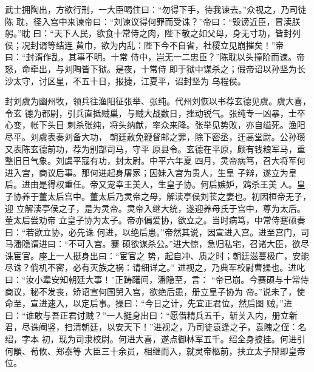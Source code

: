 武士拥陶出，方欲行刑，一大臣喝住曰：“勿得下手，待我谏去。”众视之，乃司徒陈
耽，径入宫中来谏帝曰：“刘谏议得何罪而受诛？”帝曰：“毁谤近臣，冒渎朕躬。”耽
曰：“天下人民，欲食十常侍之肉，陛下敬之如父母，身无寸功，皆封列侯；况封谞等结连
黄巾，欲为内乱：陛下今不自省，社稷立见崩摧矣！”帝曰：“封谞作乱，其事不明。十常
侍中，岂无一二忠臣？”陈耽以头撞阶而谏。帝怒，命牵出，与刘陶皆下狱。是夜，十常侍
即于狱中谋杀之；假帝诏以孙坚为长沙太守，讨区星，不五十日，报捷，江夏平，诏封坚为
乌程侯。

封刘虞为幽州牧，领兵往渔阳征张举、张纯。代州刘恢以书荐玄德见虞。虞大喜，令玄
德为都尉，引兵直抵贼巢，与贼大战数日，挫动锐气。张纯专一凶暴，士卒心变，帐下头目
刺杀张纯，将头纳献，率众来降。张举见势败，亦自缢死。渔阳尽平。刘虞表奏刘备大功，
朝廷赦免鞭督邮之罪，除下密丞，迁高堂尉。公孙瓒又表陈玄德前功，荐为别部司马，守平
原县令。玄德在平原，颇有钱粮军马，重整旧日气象。刘虞平寇有功，封太尉。中平六年夏
四月，灵帝病笃，召大将军何进入宫，商议后事。那何进起身屠家；因妹入宫为贵人，生皇
子辩，遂立为皇后。进由是得权重任。帝又宠幸王美人，生皇子协。何后嫉妒，鸩杀王美
人。皇子协养于董太后宫中。董太后乃灵帝之母，解渎亭侯刘苌之妻也。初因桓帝无子，迎
立解渎亭侯之子，是为灵帝。灵帝入继大统，遂迎养母氏于宫中，尊为太后。董太后尝劝帝
立皇子协为太子。帝亦偏爱协，欲立之。当时病笃，中常侍蹇硕奏曰：“若欲立协，必先诛
何进，以绝后患。”帝然其说，因宣进入宫。进至宫门，司马潘隐谓进曰：“不可入宫。蹇
硕欲谋杀公。”进大惊，急归私宅，召诸大臣，欲尽诛宦官。座上一人挺身出曰：“宦官之
势，起自冲、质之时；朝廷滋蔓极广，安能尽诛？倘机不密，必有灭族之祸：请细详之。”
进视之，乃典军校尉曹操也。进叱曰：“汝小辈安知朝廷大事！”正踌躇间，潘隐至，言：
“帝已崩。今赛硕与十常侍商议，秘不发丧，矫诏宣何国舅入宫，欲绝后患，册立皇子协为
帝。”说未了，使命至，宣进速入，以定后事。操曰：“今日之计，先宜正君位，然后图
贼。”进曰：“谁敢与吾正君讨贼？”一人挺身出曰：“愿借精兵五千，斩关入内，册立新
君，尽诛阉竖，扫清朝廷，以安天下！”进视之，乃司徒袁逢之子，袁隗之侄：名绍，字本
初，现为司隶校尉。何进大喜，遂点御林军五千。绍全身披挂。何进引何顒、荀攸、郑泰等
大臣三十余员，相继而入，就灵帝柩前，扶立太子辩即皇帝位。


